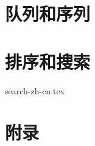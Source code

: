 \documentclass[UTF8, a4paper,twoside]{book} %
\begin{document}





\part{队列和序列}




\part{排序和搜索}


{search-zh-cn.tex}

\part{附录}
\appendix
\noappendicestocpagenum
\addappheadtotoc




%

\printindex
\end{document}
